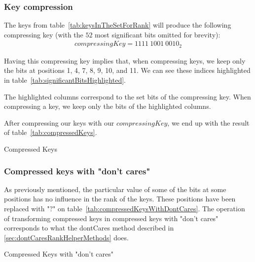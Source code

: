 \subsubsection{Key compression} \label{sec:keyCompression}

The keys from table~\ref{tab:keysInTheSetForRank} will produce the following compressing key (with the $52$ most significant bits omitted for brevity):
\begin{align*}
    compressingKey = 1111\ 1001\ 0010_2
\end{align*}

Having this compressing key implies that, when compressing keys, we keep only the bits at positions 1, 4, 7, 8, 9, 10, and 11. We can see these indices highlighted in table~\ref{tab:significantBitsHighlighted}.

\begin{table}[H]
\centering

\caption{The highlighted columns correspond to the set bits of the compressing key. When compressing a key, we keep only the bits of the highlighted columns.}
\label{tab:significantBitsHighlighted}
\end{table}

After compressing our keys with our $compressingKey$, we end up with the result of table~\ref{tab:compressedKeys}.

\begin{table}[H]
\centering

\caption{Compressed Keys}
\label{tab:compressedKeys}
\end{table}

\subsubsection{Compressed keys with "don't cares"} \label{sec:keyCompressionWithDontCares}

As previously mentioned, the particular value of some of the bits at some positions has no influence in the rank of the keys. These positions have been replaced with "$?$" on table~\ref{tab:compressedKeysWithDontCares}. The operation of transforming compressed keys in compressed keys with "don't cares" corresponds to what the {\ttfamily dontCares} method described in \ref{sec:dontCaresRankHelperMethods} does.

\begin{table}[H]
\centering

\caption{Compressed Keys with "don't cares"}
\label{tab:compressedKeysWithDontCares}
\end{table}

